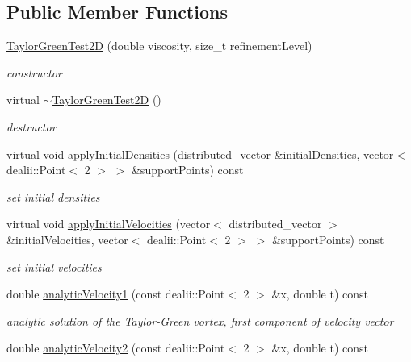 \subsection*{Public Member Functions}
\begin{DoxyCompactItemize}
\item 
\hyperlink{classTaylorGreenTest2D_a891500a30b0fae0784496f9c219bd31b}{Taylor\-Green\-Test2\-D} (double viscosity, size\-\_\-t refinement\-Level)
\begin{DoxyCompactList}\small\item\em constructor \end{DoxyCompactList}\item 
\hypertarget{classTaylorGreenTest2D_a393d90458a3415572c3d9bebccdcb662}{virtual \hyperlink{classTaylorGreenTest2D_a393d90458a3415572c3d9bebccdcb662}{$\sim$\-Taylor\-Green\-Test2\-D} ()}\label{classTaylorGreenTest2D_a393d90458a3415572c3d9bebccdcb662}

\begin{DoxyCompactList}\small\item\em destructor \end{DoxyCompactList}\item 
virtual void \hyperlink{classTaylorGreenTest2D_a02adafbe397ef264d790235320b4c4b6}{apply\-Initial\-Densities} (distributed\-\_\-vector \&initial\-Densities, vector$<$ dealii\-::\-Point$<$ 2 $>$ $>$ \&support\-Points) const 
\begin{DoxyCompactList}\small\item\em set initial densities \end{DoxyCompactList}\item 
virtual void \hyperlink{classTaylorGreenTest2D_ad4dfca769ef4500c236dda33d4d9ae54}{apply\-Initial\-Velocities} (vector$<$ distributed\-\_\-vector $>$ \&initial\-Velocities, vector$<$ dealii\-::\-Point$<$ 2 $>$ $>$ \&support\-Points) const 
\begin{DoxyCompactList}\small\item\em set initial velocities \end{DoxyCompactList}\item 
\hypertarget{classTaylorGreenTest2D_a2ae2c4a4ec55242c69a7c9cd60e8bc01}{double \hyperlink{classTaylorGreenTest2D_a2ae2c4a4ec55242c69a7c9cd60e8bc01}{analytic\-Velocity1} (const dealii\-::\-Point$<$ 2 $>$ \&x, double t) const }\label{classTaylorGreenTest2D_a2ae2c4a4ec55242c69a7c9cd60e8bc01}

\begin{DoxyCompactList}\small\item\em analytic solution of the Taylor-\/\-Green vortex, first component of velocity vector \end{DoxyCompactList}\item 
\hypertarget{classTaylorGreenTest2D_af7c07357ef5c57c46218b9c65e45572d}{double \hyperlink{classTaylorGreenTest2D_af7c07357ef5c57c46218b9c65e45572d}{analytic\-Velocity2} (const dealii\-::\-Point$<$ 2 $>$ \&x, double t) const }\label{classTaylorGreenTest2D_af7c07357ef5c57c46218b9c65e45572d}


\end{DoxyCompactItemize}
